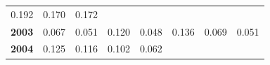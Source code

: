 \documentclass[]{article}
\begin{document}
\begin{longtable}[]{@{}rrrrrrrr@{}}
\begin{minipage}[t]{0.09\columnwidth}
0.192\strut
\end{minipage} & \begin{minipage}[t]{0.08\columnwidth}\raggedleft\strut
0.170\strut
\end{minipage} & \begin{minipage}[t]{0.10\columnwidth}\raggedleft\strut
0.172\strut
\end{minipage}\tabularnewline
\begin{minipage}[t]{0.08\columnwidth}\raggedleft\strut
\textbf{2003}\strut
\end{minipage} & \begin{minipage}[t]{0.10\columnwidth}\raggedleft\strut
0.067\strut
\end{minipage} & \begin{minipage}[t]{0.11\columnwidth}\raggedleft\strut
0.051\strut
\end{minipage} & \begin{minipage}[t]{0.08\columnwidth}\raggedleft\strut
0.120\strut
\end{minipage} & \begin{minipage}[t]{0.14\columnwidth}\raggedleft\strut
0.048\strut
\end{minipage} & \begin{minipage}[t]{0.09\columnwidth}\raggedleft\strut
0.136\strut
\end{minipage} & \begin{minipage}[t]{0.08\columnwidth}\raggedleft\strut
0.069\strut
\end{minipage} & \begin{minipage}[t]{0.10\columnwidth}\raggedleft\strut
0.051\strut
\end{minipage}\tabularnewline
\begin{minipage}[t]{0.08\columnwidth}\raggedleft\strut
\textbf{2004}\strut
\end{minipage} & \begin{minipage}[t]{0.10\columnwidth}\raggedleft\strut
0.125\strut
\end{minipage} & \begin{minipage}[t]{0.11\columnwidth}\raggedleft\strut
0.116\strut
\end{minipage} & \begin{minipage}[t]{0.08\columnwidth}\raggedleft\strut
0.102\strut
\end{minipage} & \begin{minipage}[t]{0.14\columnwidth}\raggedleft\strut
0.062\strut
\end{minipage} & \begin{minipage}[t]{0.09\columnwidth}\raggedleft\strut

\end{minipage}
\end{longtable}
\end{document}
